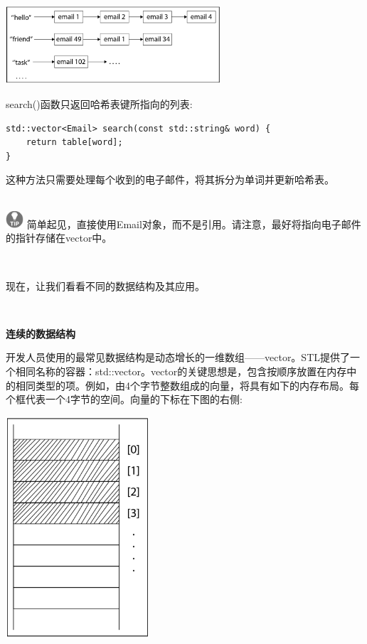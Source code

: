 \begin{center}
	\includegraphics[width=0.6\textwidth]{content/Section-2/Chapter-6/1}
\end{center}

search()函数只返回哈希表键所指向的列表: \par

\begin{lstlisting}[caption={}]
std::vector<Email> search(const std::string& word) {
	return table[word];
}
\end{lstlisting}

这种方法只需要处理每个收到的电子邮件，将其拆分为单词并更新哈希表。 \par

\hspace*{\fill} \\ %
\includegraphics[width=0.05\textwidth]{images/tip}
简单起见，直接使用Email对象，而不是引用。请注意，最好将指向电子邮件的指针存储在vector中。 \par
\noindent\textbf{}\ \par

现在，让我们看看不同的数据结构及其应用。 \par

\noindent\textbf{}\ \par
\textbf{连续的数据结构} \ \par
开发人员使用的最常见数据结构是动态增长的一维数组——vector。STL提供了一个相同名称的容器：std::vector。vector的关键思想是，包含按顺序放置在内存中的相同类型的项。例如，由4个字节整数组成的向量，将具有如下的内存布局。每个框代表一个4字节的空间。向量的下标在下图的右侧: \par

\begin{center}
	\includegraphics[width=0.4\textwidth]{content/Section-2/Chapter-6/2}
\end{center}

